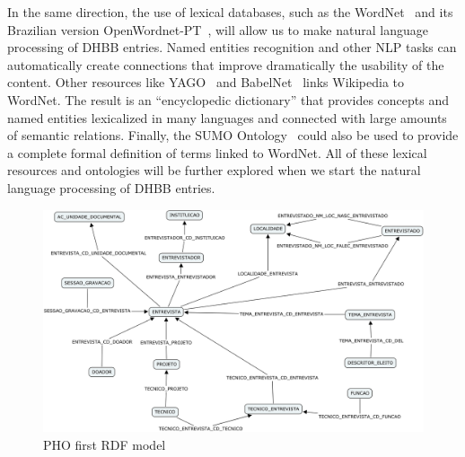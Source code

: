 In the same direction, the use of lexical databases, such as the
WordNet~\cite{wordnet} and its Brazilian version
OpenWordnet-PT~\cite{wordnet-br}, will allow us to make natural
language processing of DHBB entries. Named entities recognition and
other NLP tasks can automatically create connections that improve
dramatically the usability of the content.
Other resources like YAGO~\cite{yago} and BabelNet~\cite{babelnet}
links Wikipedia to WordNet. The result is an ``encyclopedic
dictionary'' that provides concepts and named entities lexicalized in
many languages and connected with large amounts of semantic
relations. Finally, the SUMO Ontology~\cite{sumo} could also be used
to provide a complete formal definition of terms linked to
WordNet. All of these lexical resources and ontologies will be further
explored when we start the natural language processing of DHBB
entries.


\begin{figure}[htbp]
  \centering
  \includegraphics[width=.8\textwidth]{pho.png}
  \caption{PHO first RDF model}\label{fig:pho}
\end{figure}

